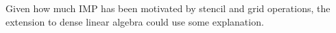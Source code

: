 Given how much IMP has been motivated by stencil and grid operations,
the extension to dense linear algebra could use some explanation.
